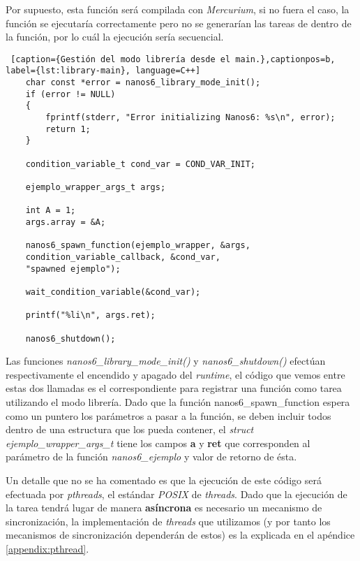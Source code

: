 Por supuesto, esta función será compilada con \textit{Mercurium}, si no fuera el caso, la función se ejecutaría correctamente pero no se generarían las tareas de dentro de la función, por lo cuál la ejecución sería secuencial. 

\begin{lstlisting} [caption={Gestión del modo librería desde el main.},captionpos=b, label={lst:library-main}, language=C++]
    char const *error = nanos6_library_mode_init();
    if (error != NULL)
    {
        fprintf(stderr, "Error initializing Nanos6: %s\n", error);
        return 1;
    }

    condition_variable_t cond_var = COND_VAR_INIT;

    ejemplo_wrapper_args_t args;

    int A = 1;
    args.array = &A;
    
    nanos6_spawn_function(ejemplo_wrapper, &args, 
    condition_variable_callback, &cond_var, 
    "spawned ejemplo");

    wait_condition_variable(&cond_var);

    printf("%li\n", args.ret);

    nanos6_shutdown();

\end{lstlisting}

Las funciones \textit{nanos6\_library\_mode\_init()} y \textit{nanos6\_shutdown()} efectúan respectivamente el encendido y apagado del \textit{runtime}, el código que vemos entre estas dos llamadas es el correspondiente para registrar una función como tarea utilizando el modo librería. Dado que la función nanos6\_spawn\_function espera como un puntero los parámetros a pasar a la función, se deben incluir todos dentro de una estructura que los pueda contener, el \textit{struct} \textit{ejemplo\_wrapper\_args\_t} tiene los campos \textbf{a} y \textbf{ret} que corresponden al parámetro de la función \textit{nanos6\_ejemplo} y valor de retorno de ésta.

\bigskip
Un detalle que no se ha comentado es que la ejecución de este código será efectuada por \textit{pthreads}, el estándar \textit{POSIX} de \textit{threads}. Dado que la ejecución de la tarea tendrá lugar de manera \textbf{asíncrona} es necesario un mecanismo de sincronización, la implementación de \textit{threads} que utilizamos (y por tanto los mecanismos de sincronización dependerán de estos) es la explicada en el apéndice \ref{appendix:pthread}.

\bigskip

